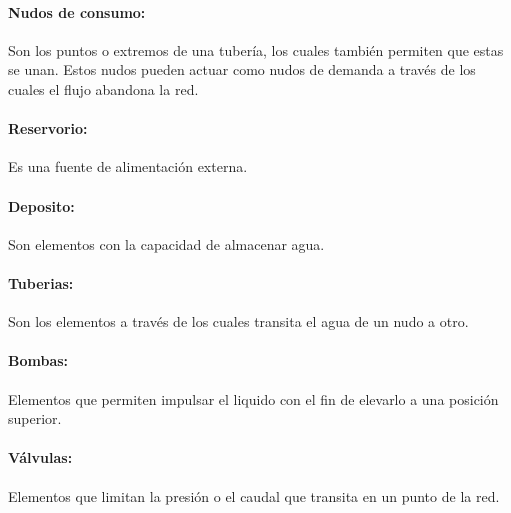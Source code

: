 \paragraph{Nudos de consumo:} Son los puntos o extremos de una tubería, los cuales también permiten que estas se unan. Estos nudos pueden actuar como nudos de demanda a través de los cuales el flujo abandona la red.

\paragraph{Reservorio:}Es una fuente de alimentación externa.
\paragraph{Deposito:}Son elementos con la capacidad de almacenar agua.
\paragraph{Tuberias:}Son los elementos a través de los cuales transita el agua de un nudo a otro.
\paragraph{Bombas:}Elementos que permiten impulsar el liquido con el fin de elevarlo a una posición superior.
\paragraph{Válvulas:}Elementos que limitan la presión o el caudal que transita en un punto de la red.